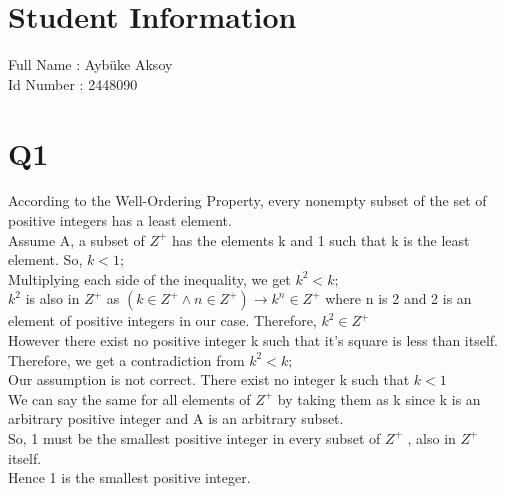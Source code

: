 \documentclass[11pt]{article}
\begin{document}
\section*{Student Information } 
Full Name :  Aybüke Aksoy\\
Id Number :  2448090\\

\section*{Q1}
According to the Well-Ordering Property, every nonempty subset of the set of positive integers has a least element.\\
Assume A, a subset of 
$Z^+$
has the elements k and 1 such that k is the least element. So,
$k<1;$\\
Multiplying each side of the inequality, we get 
$k^2<k;$\\
$k^2$
is also in
$Z^+$
as
$(k \in Z^+ \wedge n \in Z^+) \rightarrow k^n \in Z^+$
where n is 2 and 2 is an element of positive integers in our case.
Therefore,
$k^2 \in Z^+$\\
However there exist no positive integer k such that it's square is less than itself. \\
Therefore, we get a contradiction from 
$k^2<k;$\\
Our assumption is not correct. There exist no integer k such that 
$k<1$\\
We can say the same for all elements of
$Z^+$
by taking them as k since k is an arbitrary positive integer and A is an arbitrary subset.\\
So, 1 must be the smallest positive integer in every subset of
$Z^+$
, also in
$Z^+$
itself.\\
Hence 1 is the smallest positive integer.
\end{document}
